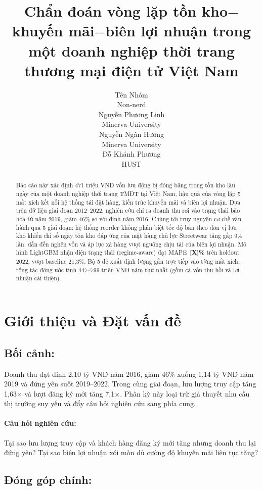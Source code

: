\documentclass{article}
\title{Chẩn đoán vòng lặp tồn kho$-$khuyến mãi$-$biên lợi nhuận
trong một doanh nghiệp thời trang thương mại điện tử Việt Nam}
\author{%
  Tên Nhóm \\
  Non-nerd \\
  \And
  Nguyễn Phương Linh \\
  Minerva University \\
  \And
  Nguyễn Ngân Hương \\
  Minerva University \\
  \And
  Đỗ Khánh Phương \\
  HUST \\
}
\begin{document}
\maketitle

\begin{abstract}
Báo cáo này xác định 471 triệu VND vốn lưu động bị đóng băng trong tồn kho
lâu ngày của một doanh nghiệp thời trang TMĐT tại Việt Nam, hậu quả của vòng
lặp 5 mắt xích kết nối hệ thống tái đặt hàng, kiến trúc khuyến
mãi và biên lợi nhuận. Dựa trên dữ liệu giai đoạn 2012--2022, nghiên cứu
chỉ ra doanh thu rơi vào trạng thái bão hòa từ năm 2019, giảm 46\% so với
đỉnh năm 2016. Chúng tôi truy nguyên cơ chế vận hành qua 5 giai đoạn: hệ
thống reorder không phân biệt tốc độ bán theo đơn vị lưu kho khiến
chỉ số ngày tồn kho đáp ứng của mặt hàng chủ lực Streetwear tăng gấp 9,4
lần, dẫn đến nghẽn vốn và áp lực xả hàng vượt ngưỡng chịu tải của biên lợi
nhuận. Mô hình LightGBM nhận diện trạng thái (regime-aware) đạt
MAPE~\textbf{[X]\%} trên holdout 2022, vượt baseline 21,3\%. Bộ 5 đề xuất
định lượng gắn trực tiếp vào từng mắt xích, tổng tác động ước tính
447--799 triệu VND năm thứ nhất (gồm cả vốn thu hồi và lợi nhuận cải thiện).
\end{abstract}

\section{Giới thiệu và Đặt vấn đề}
\subsection {Bối cảnh:}
Doanh thu đạt đỉnh 2,10 tỷ VND năm 2016, giảm 46\% xuống 1,14 tỷ VND năm
2019 và đứng yên suốt 2019--2022. Trong cùng giai đoạn, lưu lượng truy cập
tăng 1,63$\times$ và lượt đăng ký mới tăng 7,1$\times$. Phân kỳ này loại
trừ giả thuyết nhu cầu thị trường suy yếu và đẩy câu hỏi nghiên cứu sang
phía cung.
\paragraph{Câu hỏi nghiên cứu:}
Tại sao lưu lượng truy cập và khách hàng đăng ký mới tăng nhưng doanh thu lại đứng yên? Tại sao biên lợi nhuận xói mòn dù cường độ khuyến mãi liên tục tăng?

\subsection{Đóng góp chính:}
\end{document}
